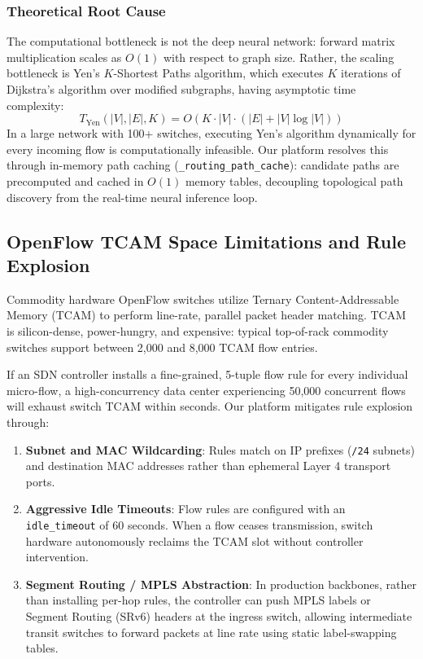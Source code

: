 \documentclass[12pt,a4paper,oneside]{report}
\begin{document}
\subsubsection{Theoretical Root Cause}
The computational bottleneck is not the deep neural network: forward matrix multiplication scales as $O(1)$ with respect to graph size. Rather, the scaling bottleneck is Yen's $K$-Shortest Paths algorithm, which executes $K$ iterations of Dijkstra's algorithm over modified subgraphs, having asymptotic time complexity:
\begin{equation}
    T_{\text{Yen}}(|V|, |E|, K) = O(K \cdot |V| \cdot (|E| + |V| \log |V|))
\end{equation}
In a large network with 100+ switches, executing Yen's algorithm dynamically for every incoming flow is computationally infeasible. Our platform resolves this through in-memory path caching (\texttt{\_routing\_path\_cache}): candidate paths are precomputed and cached in $O(1)$ memory tables, decoupling topological path discovery from the real-time neural inference loop.

\subsection{OpenFlow TCAM Space Limitations and Rule Explosion}
Commodity hardware OpenFlow switches utilize Ternary Content-Addressable Memory (TCAM) to perform line-rate, parallel packet header matching. TCAM is silicon-dense, power-hungry, and expensive: typical top-of-rack commodity switches support between 2,000 and 8,000 TCAM flow entries.

If an SDN controller installs a fine-grained, 5-tuple flow rule for every individual micro-flow, a high-concurrency data center experiencing 50,000 concurrent flows will exhaust switch TCAM within seconds. Our platform mitigates rule explosion through:
\begin{enumerate}
    \item \textbf{Subnet and MAC Wildcarding}: Rules match on IP prefixes (\texttt{/24} subnets) and destination MAC addresses rather than ephemeral Layer 4 transport ports.
    \item \textbf{Aggressive Idle Timeouts}: Flow rules are configured with an \texttt{idle\_timeout} of 60 seconds. When a flow ceases transmission, switch hardware autonomously reclaims the TCAM slot without controller intervention.
    \item \textbf{Segment Routing / MPLS Abstraction}: In production backbones, rather than installing per-hop rules, the controller can push MPLS labels or Segment Routing (SRv6) headers at the ingress switch, allowing intermediate transit switches to forward packets at line rate using static label-swapping tables.
\end{enumerate}
\end{document}
